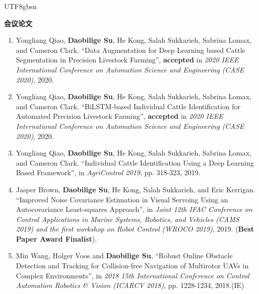 \documentclass[margin,line]{res}
\begin{document}
\begin{CJK*}{UTF8}{gbsn}
\begin{resume}
\textbf{会议论文}
\begin{enumerate}

\item Yongliang Qiao, \textbf{Daobilige Su}, He Kong, Salah Sukkarieh, Sabrina Lomax, and Cameron Clark. ``Data Augmentation for Deep Learning based Cattle Segmentation in Precision Livestock Farming'', \textbf{accepted} in \textit{2020 IEEE International Conference on Automation Science and Engineering (CASE 2020)}, 2020.

\item Yongliang Qiao, \textbf{Daobilige Su}, He Kong, Salah Sukkarieh, Sabrina Lomax, and Cameron Clark. ``BiLSTM-based Individual Cattle Identification for Automated Precision Livestock Farming'', \textbf{accepted} in \textit{2020 IEEE International Conference on Automation Science and Engineering (CASE 2020)}, 2020.

\item Yongliang Qiao, \textbf{Daobilige Su}, He Kong, Salah Sukkarieh, Sabrina Lomax, and Cameron Clark. ``Individual Cattle Identification Using a Deep Learning Based Framework'', in {\it AgriControl 2019}, pp. 318-323, 2019.

\item Jasper Brown, \textbf{Daobilige Su}, He Kong, Salah Sukkarieh, and Eric Kerrigan. ``Improved Noise Covariance Estimation in Visual Servoing Using an Autocovariance Least-squares Approach'', in \textit{Joint 12th IFAC Conference on Control Applications in Marine Systems, Robotics, and Vehicles (CAMS 2019) and the first workshop on Robot Control (WROCO 2019)}, 2019. ({\bf Best Paper Award Finalist}).

\item Min Wang, Holger Voos and {\bf Daobilige Su}, ``Robust Online Obstacle Detection and Tracking for Collision-free Navigation of Multirotor UAVs in Complex Environments'', in {\it 2018 15th International Conference on Control Automation Robotics \& Vision (ICARCV 2018)}, pp. 1228-1234, 2018.(IE)


\end{enumerate}
\end{resume}
\end{CJK*}
\end{document}
